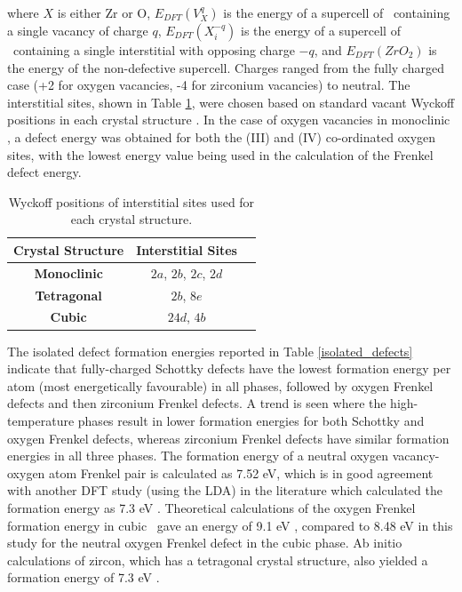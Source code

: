 where $X$ is either Zr or O, $E_{DFT}(V^{q}_{X})$ is the energy of a supercell of \zirconia\ containing a single vacancy of charge $q$, $E_{DFT}(X^{-q}_{i})$ is the energy of a supercell of \zirconia\ containing a single interstitial with opposing charge $-q$, and $E_{DFT}(ZrO_2)$ is the energy of the non-defective supercell. Charges ranged from the fully charged case (+2 for oxygen vacancies, -4 for zirconium vacancies) to neutral. The interstitial sites, shown in Table \ref{table:interstitials}, were chosen based on standard vacant Wyckoff positions in each crystal structure \cite{theo1996international}.  In the case of oxygen vacancies in monoclinic \zirconia , a defect energy was obtained for both the (III) and (IV) co-ordinated oxygen sites, with the lowest energy value being used in the calculation of the Frenkel defect energy.

\begin{table}[ht] %
\onehalfspacing
\centering
\caption{Wyckoff positions of interstitial sites used for each crystal structure.}
\label{table:interstitials}
\begin{tabular}{lcc}
\hline
\hspace{0.7 cm} {\bf Crystal Structure} \hspace{0.7 cm}                              & \hspace{0.7 cm} {\bf Interstitial Sites} \hspace{0.7 cm}                                               \\ \hline
\multicolumn{1}{c}{\textbf{Monoclinic}}              & $2a$, $2b$, $2c$, $2d$ \\
\multicolumn{1}{c}{\textbf{Tetragonal}}            & $2b$, $8e$                                   \\
\multicolumn{1}{c}{\textbf{Cubic}}       & $24d$, $4b$                                          \\ \hline
\end{tabular}
\end{table}

The isolated defect formation energies reported in Table \ref{isolated_defects} indicate that fully-charged Schottky defects have the lowest formation energy per atom (most energetically favourable) in all phases, followed by oxygen Frenkel defects and then zirconium Frenkel defects. A trend is seen where the high-temperature phases result in lower formation energies for both Schottky and oxygen Frenkel defects, whereas zirconium Frenkel defects have similar formation energies in all three phases. The formation energy of a neutral oxygen vacancy-oxygen atom Frenkel pair is calculated as 7.52 eV, which is in good agreement with another DFT study (using the LDA) in the literature which calculated the formation energy as 7.3 eV \cite{Foster2002}. Theoretical calculations of the oxygen Frenkel formation energy in cubic \zirconia\ gave an energy of 9.1 eV \cite{mackrodt1986theoretical}, compared to 8.48 eV in this study for the neutral oxygen Frenkel defect in the cubic phase. Ab initio calculations of zircon, which has a tetragonal crystal structure, also yielded a formation energy of 7.3 eV \cite{Crocombette1999}.

